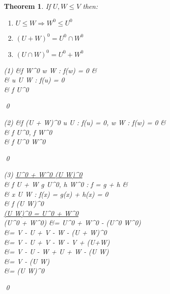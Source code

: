 \documentclass[11pt, a4paper]{report}
\makeatletter
\numberwithin{equation}{section}
\numberwithin{equation}{subsection}
\theoremstyle{plain}
\newtheorem{thm}{Theorem}[chapter] %
\theoremstyle{definition}
\theoremstyle{remark}
\newtheorem*{prf}{Proof}
\renewenvironment{prf}[1][\proofname]{\par
  \vspace{-\topsep}%
  \normalfont
  \topsep0pt \partopsep0pt %
  \trivlist
  \item[\hskip\labelsep
        \itshape
    #1\@addpunct{.}]\ignorespaces
}{%
  \popQED\endtrivlist\@endpefalse
  \addvspace{6pt plus 6pt} %
}
\newcommand{\pr}[1]{\begin{adjustwidth}{1cm}{} \begin{prf} #1 \end{prf} \end{adjustwidth}}
\makeatother
\begin{document}
\begin{thm}
If $U, W \leq V$ then:
\begin{enumerate}[(1) ]
\item $U \leq W \Longrightarrow W^0 \leq U^0$
\item $(U+W)^0 = U^0 \cap W^0$
\item $(U \cap W)^0 = U^0 + W^0$
\end{enumerate}

\pr{
\begin{flalign*}
(1) \hspace*{80pt} &f \in W^0 \iff \forall w \in W : f(w) = 0 &\\
			& \phantom{f \in W^0\,\;}\Longrightarrow \forall u \in U \leq W : f(u) = 0\\
			&\phantom{f \in W^0} \iff f \in U^0
\end{flalign*}\qed

\begin{flalign*}
(2) \hspace*{50pt} &f \in (U + W)^0 \iff \forall u \in U : f(u) = 0, \forall w \in W : f(w) = 0 &\\
 &\phantom{f \in (U + W)^0} \iff f \in U^0, f \in W^0\\
 &\phantom{f \in (U + W)^0} \iff f \in U^0 \cap W^0
\end{flalign*}\qed

\begin{flalign*}
(3) \hspace*{10pt} \underline{U^0 + W^0 \leq (U \cap W)^0}\\
& f \in U + W \iff \exists g \in U^0, \exists h \in W^0 : f = g + h &\\
& \phantom{f \in U + W \;\,} \Longrightarrow \forall x \in U \cap W : f(x) = g(x) + h(x) = 0\\
& \phantom{f \in U + W} \iff f \in (U \cap W)^0\\
\phantom{(3) \hspace*{10pt}} \underline{(U \cap W)^0 = U^0 + W^0}\\
 \dim(U^0 + W^0) &= \dim U^0 + \dim W^0 - \dim (U^0 \cap W^0)\\
 	&= \dim V - \dim U + \dim V - \dim W - \dim(U + W)^0\\
 	&= \dim V - \dim U + \dim V - \dim W - \dim V + \dim (U+W)\\
 	&= \dim V - \dim U - \dim W + \dim U + \dim W - \dim(U \cap W)\\
 	&= \dim V - \dim (U \cap W)\\
 	&= \dim (U \cap W)^0
\end{flalign*}\qed
}
\end{thm}
\end{document}

